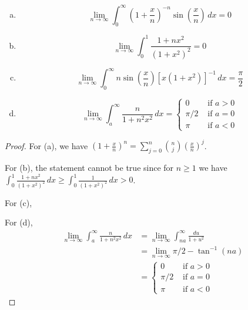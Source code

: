 \documentclass{article}
\begin{document}
\begin{enumerate}[(a)]
\item $$\lim_{n\to \infty} \int_0^\infty \left( 1 + \frac x n \right)^{-n} \sin \left(\frac x n \right) \, dx = 0$$
\item $$\lim_{n \to \infty} \int_0^1 \frac{1 + n x^2} {(1 + x^2)^2} = 0$$
\item $$\lim_{n \to \infty} \int_0^\infty n \sin \left( \frac x n \right) [x(1+x^2)]^{-1} \, dx = \frac \pi 2$$
\item $$\lim_{n \to \infty} \int_a^\infty \frac n {1 + n^2 x^2} \, dx= \left\{ 
\begin{array}{ll}
   0 & \text{ if } a > 0
\\ \pi/2 & \text{ if } a = 0
\\ \pi  & \text{ if } a < 0
\end{array} \right.
$$
\end{enumerate}

\begin{proof}
For (a), we have $(1 + \frac x n )^n    = \sum_{j=0}^n { n \choose j } \left( \frac x n \right)^j$.

For (b), the statement cannot be true since for $n \ge 1$ we have $\int_0^1 \frac{1 + n x^2} {(1 + x^2)^2} \, dx \ge \int_0^1 \frac 1 {(1+x^2)^2} \,dx > 0$.

For (c),


For (d),
\begin{align*}
\lim_{n \to \infty} \int_a^\infty \frac n {1 + n^2 x^2} \, dx  & = \lim_{n \to \infty} \int_{na}^\infty \frac {du} {1 + u^2} 
\\ & = \lim_{n \to \infty} \pi/2 - \tan^{-1}(na)
\\ & = \left\{ 
\begin{array}{ll}
   0 & \text{ if } a > 0
\\ \pi/2 & \text{ if } a = 0
\\ \pi  & \text{ if } a < 0
\end{array} \right.
\end{align*}




\end{proof}
\end{document}
